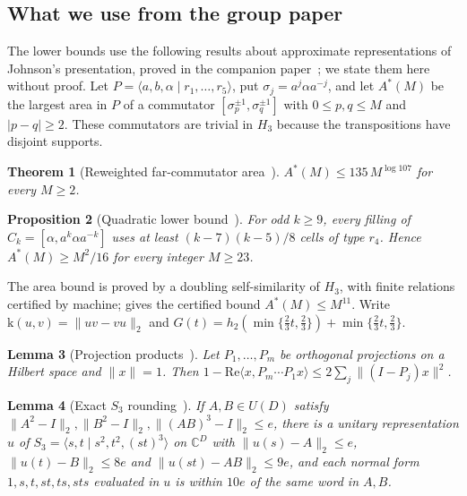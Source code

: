\documentclass[11pt,a4paper]{article}
\theoremstyle{plain}
\newtheorem{theorem}{Theorem}[section]
\newtheorem{proposition}[theorem]{Proposition}
\newtheorem{lemma}[theorem]{Lemma}
\theoremstyle{definition}
\theoremstyle{remark}
\begin{document}
\subsection{What we use from the group paper}\label{sec:imported}

The lower bounds use the following results about approximate representations of Johnson's presentation, proved in the companion
paper~\cite{DouglasMghirbiA}; we state them here without proof. Let $P=\langle a,b,\alpha\mid r_1,\dots,r_5\rangle$, put
$\sigma_j=a^j\alpha a^{-j}$, and let $A^*(M)$ be the largest area in $P$ of a commutator $[\sigma_p^{\pm1},\sigma_q^{\pm1}]$ with
$0\le p,q\le M$ and $|p-q|\ge2$. These commutators are trivial in $H_3$ because the transpositions have disjoint supports.

\begin{theorem}[Reweighted far-commutator area~{\cite[Theorem~3.2]{DouglasMghirbiA}}]\label{thm:area-weighted}
$A^*(M)\le135\,M^{\log107}$ for every $M\ge2$.
\end{theorem}

\begin{proposition}[Quadratic lower bound~{\cite[Proposition~3.4]{DouglasMghirbiA}}]\label{prop:area-lower}
For odd $k\ge9$, every filling of $C_k=[\alpha,a^k\alpha a^{-k}]$ uses at least $(k-7)(k-5)/8$ cells of type $r_4$. Hence $A^*(M)\ge M^2/16$ for
every integer $M\ge23$.
\end{proposition}

The area bound is proved by a doubling self-similarity of $H_3$, with finite relations certified by machine;
\cite[Theorem~3.1]{DouglasMghirbiA} gives the certified bound $A^*(M)\le M^{11}$. Write $\mathrm{k}(u,v)=\|uv-vu\|_2$ and
$G(t)=h_2(\min\{\frac23t,\frac23\})+\min\{\frac23t,\frac23\}$.

\begin{lemma}[Projection products~{\cite[Lemma~4.1]{DouglasMghirbiA}}]\label{lem:projections}
Let $P_1,\dots,P_m$ be orthogonal projections on a Hilbert space and $\|x\|=1$. Then
$1-\mathrm{Re}\langle x,P_m\cdots P_1x\rangle\le2\sum_j\|(I-P_j)x\|^2$.
\end{lemma}

\begin{lemma}[Exact $S_3$ rounding~{\cite[Lemma~4.3]{DouglasMghirbiA}}]\label{lem:s3round}
If $A,B\in U(D)$ satisfy $\|A^2-I\|_2,\|B^2-I\|_2,\|(AB)^3-I\|_2\le e$, there is a unitary representation $u$ of
$S_3=\langle s,t\mid s^2,t^2,(st)^3\rangle$ on $\mathbb C^D$ with $\|u(s)-A\|_2\le e$, $\|u(t)-B\|_2\le8e$ and $\|u(st)-AB\|_2\le9e$, and
each normal form $1,s,t,st,ts,sts$ evaluated in $u$ is within $10e$ of the same word in $A,B$.
\end{lemma}
\end{document}
